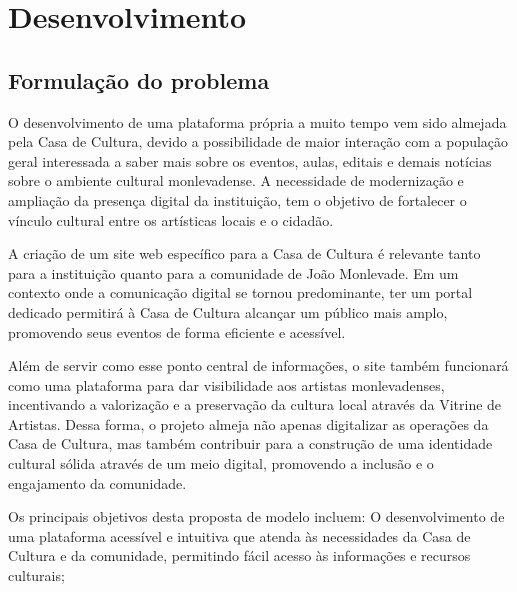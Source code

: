 \chapter{Desenvolvimento}
\label{cap:desenvolvimento}

\section{Formulação do problema}

O desenvolvimento de uma plataforma própria a muito tempo vem sido almejada pela Casa de Cultura, devido a possibilidade de maior interação com a população geral interessada a saber mais sobre os eventos, aulas, editais e demais notícias sobre o ambiente cultural monlevadense. A necessidade de modernização e ampliação da presença digital da instituição, tem o objetivo de fortalecer o vínculo cultural entre os artísticas locais e o cidadão.

A criação de um site web específico para a Casa de Cultura é relevante tanto para a instituição quanto para a comunidade de João Monlevade. Em um contexto onde a comunicação digital se tornou predominante, ter um portal dedicado permitirá à Casa de Cultura alcançar um público mais amplo, promovendo seus eventos de forma eficiente e acessível. 

Além de servir como esse ponto central de informações, o site também funcionará como uma plataforma para dar visibilidade aos artistas monlevadenses, incentivando a valorização e a preservação da cultura local através da Vitrine de Artistas. Dessa forma, o projeto almeja não apenas digitalizar as operações da Casa de Cultura, mas também contribuir para a construção de uma identidade cultural sólida através de um meio digital, promovendo a inclusão e o engajamento da comunidade.

Os principais objetivos desta proposta de modelo incluem: O desenvolvimento de uma plataforma acessível e intuitiva que atenda às necessidades da Casa de Cultura e da comunidade, permitindo fácil acesso às informações e recursos culturais;

